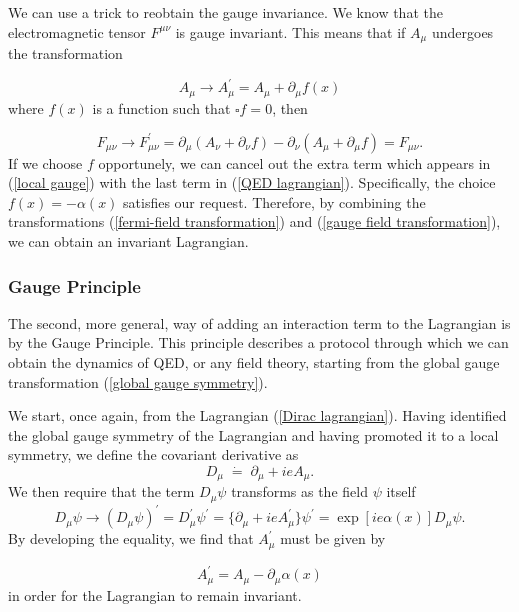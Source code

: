 \documentclass[10pt,a4paper]{book}
\begin{document}
We can use a trick to reobtain the gauge invariance. We know that the electromagnetic tensor $F^{\mu\nu}$ is gauge invariant. This means that if $A_\mu$ undergoes the transformation

\begin{equation}
A_\mu \rightarrow A_{\mu}^\prime = A_\mu + \partial_\mu f(x)
\label{gauge field transformation}
\end{equation}
where $f(x)$ is a function such that $\square f = 0$, then

\begin{equation}
F_{\mu\nu} \rightarrow F_{\mu\nu}^\prime = \partial_\mu (A_\nu + \partial_\nu f) - \partial_\nu (A_\mu + \partial_\mu f) = F_{\mu\nu}.
\end{equation}
If we choose $f$ opportunely, we can cancel out the extra term which appears in (\ref{local gauge}) with the last term in (\ref{QED lagrangian}). Specifically, the choice $f(x) = -\alpha(x)$ satisfies our request.
Therefore, by combining the transformations (\ref{fermi-field transformation}) and (\ref{gauge field transformation}), we can obtain an invariant Lagrangian.

\subsubsection{Gauge Principle}

The second, more general, way of adding an interaction term to the Lagrangian is by the Gauge Principle. This principle describes a protocol through which we can obtain the dynamics of QED, or any field theory, starting from the global gauge transformation (\ref{global gauge symmetry}).

We start, once again, from the Lagrangian (\ref{Dirac lagrangian}). Having identified the global gauge symmetry of the Lagrangian and having promoted it to a local symmetry, we define the covariant derivative as 
\begin{equation}
D_\mu \; \dot{=} \; \partial_\mu + ieA_\mu.
\end{equation}
We then require that the term $D_\mu \psi$ transforms as the field $\psi$ itself
\begin{equation}
D_\mu \psi \rightarrow (D_\mu \psi)^\prime = D_\mu^\prime \psi^\prime = \lbrace \partial_\mu + ieA^\prime_\mu \rbrace \psi^\prime = \exp[ie\alpha(x)]D_\mu\psi.
\end{equation}
By developing the equality, we find that $A^\prime_\mu$ must be given by

\begin{equation}
A^\prime_\mu = A_\mu - \partial_\mu \alpha(x)
\end{equation}
in order for the Lagrangian to remain invariant.
\end{document}
